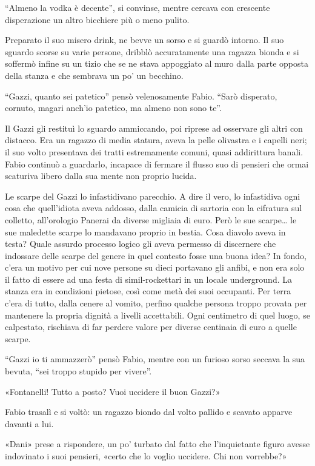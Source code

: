 ``Almeno la vodka è decente'', si convinse, mentre cercava con crescente disperazione un altro bicchiere più o meno pulito.

Preparato il suo misero drink, ne bevve un sorso e si guardò intorno. Il suo sguardo scorse su varie persone, dribblò accuratamente una ragazza bionda e si soffermò infine su un tizio che se ne stava appoggiato al muro dalla parte opposta della stanza e che sembrava un po' un becchino.

``Gazzi, quanto sei patetico'' pensò velenosamente Fabio. ``Sarò disperato, cornuto, magari anch'io patetico, ma almeno non sono te''.

Il Gazzi gli restituì lo sguardo ammiccando, poi riprese ad osservare gli altri con distacco. Era un ragazzo di media statura, aveva la pelle olivastra e i capelli neri; il suo volto presentava dei tratti estremamente comuni, quasi addirittura banali. Fabio continuò a guardarlo, incapace di fermare il flusso suo di pensieri che ormai scaturiva libero dalla sua mente non proprio lucida.

Le scarpe del Gazzi lo infastidivano parecchio. A dire il vero, lo infastidiva ogni cosa che quell'idiota aveva addosso, dalla camicia di sartoria con la cifratura sul colletto, all'orologio Panerai da diverse migliaia di euro. Però le sue scarpe\ldots{} le sue maledette scarpe lo mandavano proprio in bestia. Cosa diavolo aveva in testa? Quale assurdo processo logico gli aveva permesso di discernere che indossare delle scarpe del genere in quel contesto fosse una buona idea? In fondo, c'era un motivo per cui nove persone su dieci portavano gli anfibi, e non era solo il fatto di essere ad una festa di simil-rockettari in un locale underground. La stanza era in condizioni pietose, così come metà dei suoi occupanti. Per terra c'era di tutto, dalla cenere al vomito, perfino qualche persona troppo provata per mantenere la propria dignità a livelli accettabili. Ogni centimetro di quel luogo, se calpestato, rischiava di far perdere valore per diverse centinaia di euro a quelle scarpe.

``Gazzi io ti ammazzerò'' pensò Fabio, mentre con un furioso sorso seccava la sua bevuta, ``sei troppo stupido per vivere''.

«Fontanelli! Tutto a posto? Vuoi uccidere il buon Gazzi?»

Fabio trasalì e si voltò: un ragazzo biondo dal volto pallido e scavato apparve davanti a lui.

«Dani» prese a rispondere, un po' turbato dal fatto che l'inquietante figuro avesse indovinato i suoi pensieri, «certo che lo voglio uccidere. Chi non vorrebbe?»

